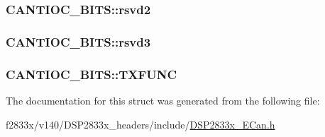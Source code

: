 \subsubsection[{rsvd2}]{ C\+A\+N\+T\+I\+O\+C\+\_\+\+B\+I\+T\+S\+::rsvd2}\label{struct_c_a_n_t_i_o_c___b_i_t_s_ab5a9b1d36c7c21760855c2156fc1b99a}
\hypertarget{struct_c_a_n_t_i_o_c___b_i_t_s_a157f1e93a4e54a12988c59ad06c300e9}{}
\subsubsection[{rsvd3}]{ C\+A\+N\+T\+I\+O\+C\+\_\+\+B\+I\+T\+S\+::rsvd3}\label{struct_c_a_n_t_i_o_c___b_i_t_s_a157f1e93a4e54a12988c59ad06c300e9}
\hypertarget{struct_c_a_n_t_i_o_c___b_i_t_s_a04c3a3381e8d68dea3a1c6188cfd16fb}{}
\subsubsection[{T\+X\+F\+U\+N\+C}]{ C\+A\+N\+T\+I\+O\+C\+\_\+\+B\+I\+T\+S\+::\+T\+X\+F\+U\+N\+C}\label{struct_c_a_n_t_i_o_c___b_i_t_s_a04c3a3381e8d68dea3a1c6188cfd16fb}


The documentation for this struct was generated from the following file\+:\begin{DoxyCompactItemize}
\item 
f2833x/v140/\+D\+S\+P2833x\+\_\+headers/include/\hyperlink{_d_s_p2833x___e_can_8h}{D\+S\+P2833x\+\_\+\+E\+Can.\+h}\end{DoxyCompactItemize}
